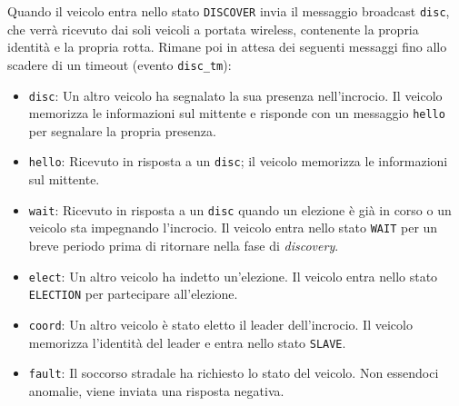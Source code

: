 \documentclass{memoir}
\begin{document}
\begin{figure}[h]
  \centering
\end{figure}
Quando il veicolo entra nello stato \texttt{DISCOVER} invia il messaggio
broadcast \texttt{disc}, che verrà ricevuto dai soli veicoli a portata wireless,
contenente la propria identità e la propria rotta. Rimane poi in attesa dei
seguenti messaggi fino allo scadere di un timeout (evento \texttt{disc\_tm}):
\begin{itemize}
\item \texttt{disc}: Un altro veicolo ha segnalato la sua presenza
  nell'incrocio. Il veicolo memorizza le informazioni sul mittente e risponde
  con un messaggio \texttt{hello} per segnalare la propria presenza.
\item \texttt{hello}: Ricevuto in risposta a un \texttt{disc}; il veicolo
  memorizza le informazioni sul mittente.
\item \texttt{wait}: Ricevuto in risposta a un \texttt{disc} quando un elezione
  è già in corso o un veicolo sta impegnando l'incrocio. Il veicolo entra nello
  stato \texttt{WAIT} per un breve periodo prima di ritornare nella fase di
  \emph{discovery}.
\item \texttt{elect}: Un altro veicolo ha indetto un'elezione. Il veicolo entra
  nello stato \texttt{ELECTION} per partecipare all'elezione.
\item \texttt{coord}: Un altro veicolo è stato eletto il leader dell'incrocio.
  Il veicolo memorizza l'identità del leader e entra nello stato \texttt{SLAVE}.
\item \texttt{fault}: Il soccorso stradale ha richiesto lo stato del veicolo.
  Non essendoci anomalie, viene inviata una risposta negativa.
\end{itemize}
\end{document}
